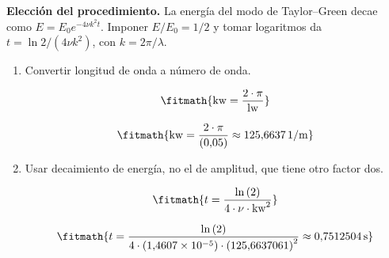\noindent\textbf{Elección del procedimiento.} La energía del modo de Taylor--Green decae como $E=E_0e^{-4\nu k^2t}$. Imponer $E/E_0=1/2$ y tomar logaritmos da $t=\ln2/(4\nu k^2)$, con $k=2\pi/\lambda$.

\begin{enumerate}

\item Convertir longitud de onda a número de onda.

\[\fitmath{\mathrm{kw}=\frac{2\cdot \pi}{\mathrm{lw}}}\]

\[\fitmath{\mathrm{kw}=\frac{2\cdot \pi}{(0{,}05)}\approx 125{,}6637\,\mathrm{1/m}}\]

\item Usar decaimiento de energía, no el de amplitud, que tiene otro factor dos.

\[\fitmath{t=\frac{\ln\left(2\right)}{4\cdot \nu\cdot {\mathrm{kw}}^{2}}}\]

\[\fitmath{t=\frac{\ln\left(2\right)}{4\cdot (1{,}4607\times10^{-5})\cdot {(125{,}6637061)}^{2}}\approx 0{,}7512504\,\mathrm{s}}\]

\end{enumerate}
